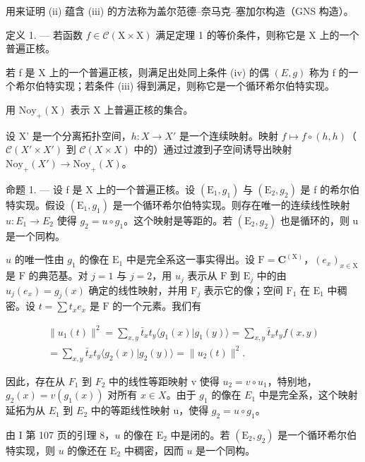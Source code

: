 用来证明 (ii) 蕴含 (iii) 的方法称为盖尔范德–奈马克–塞加尔构造（GNS 构造）。

定义 1. --- 若函数 \(f \in \mathcal{C}(\mathrm{X} \times \mathrm{X})\) 满足定理 1 的等价条件，则称它是 X 上的一个普遍正核。

若 f 是 X 上的一个普遍正核，则满足出处同上条件 (iv) 的偶 \((E,g)\) 称为 f 的一个希尔伯特实现；若条件 (iii) 得到满足，则称它是一个循环希尔伯特实现。

用 \(\mathrm{Noy}_{+}(\mathrm{X})\) 表示 X 上普遍正核的集合。

设 X' 是一个分离拓扑空间，\(h: X \to X'\) 是一个连续映射。映射 \(f \mapsto f \circ (h, h)\)（\(\mathcal{C}(X' \times X')\) 到 \(\mathcal{C}(X \times X)\) 中的）通过过渡到子空间诱导出映射 \(\mathrm{Noy}_{+}(X') \to \mathrm{Noy}_{+}(X)\)。

命题 1. --- 设 f 是 X 上的一个普遍正核。设 \((\mathrm{E}_{1}, g_{1})\) 与 \((\mathrm{E}_{2}, g_{2})\) 是 f 的希尔伯特实现。假设 \((\mathrm{E}_{1}, g_{1})\) 是一个循环希尔伯特实现。则存在唯一的连续线性映射 \(u: E_{1} \to E_{2}\) 使得 \(g_{2} = u \circ g_{1}\)。这个映射是等距的。若 \((\mathrm{E}_{2}, g_{2})\) 也是循环的，则 u 是一个同构。

\(u\) 的唯一性由 \(g_{1}\) 的像在 \(\mathrm{E}_{1}\) 中是完全系这一事实得出。设 \(\mathrm{F} = \mathbf{C}^{(\mathrm{X})}\)，\((e_x)_{x\in \mathrm{X}}\) 是 \(\mathrm{F}\) 的典范基。对 \(j = 1\) 与 \(j = 2\)，用 \(u_{j}\) 表示从 \(\mathrm{F}\) 到 \(\mathrm{E}_{j}\) 中的由 \(u_{j}(e_{x}) = g_{j}(x)\) 确定的线性映射，并用 \(\mathrm{F}_{j}\) 表示它的像；空间 \(\mathrm{F}_{1}\) 在 \(\mathrm{E}_{1}\) 中稠密。设 \(t = \sum t_{x}e_{x}\) 是 \(\mathrm{F}\) 的一个元素。我们有

\[
\begin{array}{c} \| u _ {1} (t) \| ^ {2} = \sum_ {x, y} \bar {t} _ {x} t _ {y} \langle g _ {1} (x)   |   g _ {1} (y) \rangle = \sum_ {x, y} \bar {t} _ {x} t _ {y} f (x, y) \\ = \sum_ {x, y} \bar {t} _ {x} t _ {y} \langle g _ {2} (x)   |   g _ {2} (y) \rangle = \| u _ {2} (t) \| ^ {2}. \end{array}
\]

因此，存在从 \(F_{1}\) 到 \(F_{2}\) 中的线性等距映射 v 使得 \(u_{2}=v\circ u_{1}\)，特别地，\(g_{2}(x)=v(g_{1}(x))\) 对所有 \(x\in X\)。由于 \(g_{1}\) 的像在 \(E_{1}\) 中是完全系，这个映射延拓为从 \(E_{1}\) 到 \(E_{2}\) 中的等距线性映射 u，使得 \(g_{2}=u\circ g_{1}\)。

由 I 第 107 页的引理 8，\(u\) 的像在 \(\mathrm{E}_2\) 中是闭的。若 \((\mathrm{E}_2,g_2)\) 是一个循环希尔伯特实现，则 \(u\) 的像还在 \(\mathrm{E}_2\) 中稠密，因而 \(u\) 是一个同构。

